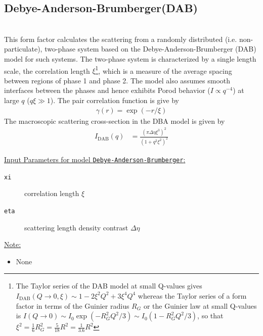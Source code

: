 
\clearpage
\subsection{Debye-Anderson-Brumberger(DAB)}
\label{sect:DAB}~\\

This form factor calculates the scattering from a randomly
distributed (i.e. non-particulate), two-phase system based on the
Debye-Anderson-Brumberger (DAB) \cite{DAB1957,DebyeBueche1949} model
for such systems. The two-phase system is characterized by a single
length scale, the correlation length $\xi$\footnote{
The Taylor series of the DAB model at small Q-values gives $I_\text{DAB}(Q\rightarrow 0,\xi) \sim 1-2\xi^2Q^2+3\xi^4Q^4$ whereas the Taylor series of a form factor in terms of the Guinier radius $R_G$ or the Guinier law at small Q-values is $I(Q\rightarrow 0)\sim I_0\exp\left(-R_G^2Q^2/3\right)\sim I_0 \left(1-R_G^2Q^2/3\right)$, so that $\xi^2=\frac{1}{6} R_G^2=\frac{5}{18} R^2=\frac{1}{3.6} R^2$
}, which is a measure of
the average spacing between regions of phase 1 and phase 2. The
model also assumes smooth interfaces between the phases and hence
exhibits Porod behavior ($I \propto q^{-4}$) at large $q$ ($q \xi
\gg 1$). The pair correlation function is give by
\cite{DebyeBueche1949}
\begin{align}
\gamma(r) = \exp(-r/\xi)
\end{align}
The macroscopic scattering cross-section in the DBA model is given
by
\begin{align}
I_\mathrm{DAB}(q) &= \frac{\left(\pi\Delta\eta\xi^3\right)^2}{\left(1+q^2\xi^2\right)^2}
\end{align}


\underline{Input Parameters for model \texttt{Debye-Anderson-Brumberger}:}\\
\begin{description}
\item[\texttt{xi}] correlation length $\xi$
\item[\texttt{eta}] scattering length density contrast $\Delta\eta$
\end{description}

\underline{Note:}
\begin{itemize}
\item None
\end{itemize}



